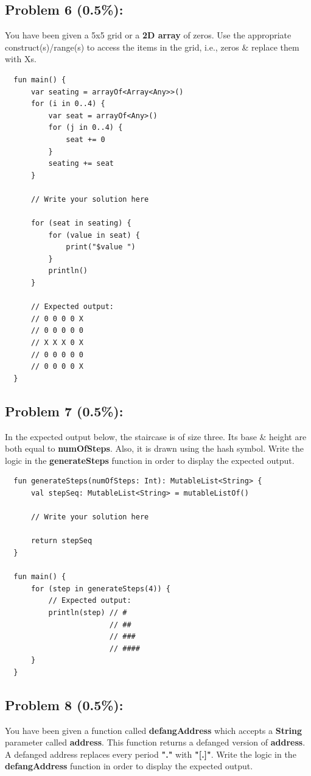 \documentclass{article}
\begin{document}
\subsection*{Problem 6 (0.5\%):}
You have been given a 5x5 grid or a \textbf{2D array} of zeros. Use the appropriate construct(s)/range(s) to access the items in the grid, i.e., zeros \& replace them with Xs.

\begin{verbatim}
  fun main() {
      var seating = arrayOf<Array<Any>>()
      for (i in 0..4) {
          var seat = arrayOf<Any>()
          for (j in 0..4) {
              seat += 0
          }
          seating += seat
      }

      // Write your solution here

      for (seat in seating) {
          for (value in seat) {
              print("$value ")
          }
          println()
      }

      // Expected output:
      // 0 0 0 0 X 
      // 0 0 0 0 0 
      // X X X 0 X 
      // 0 0 0 0 0 
      // 0 0 0 0 X
  }
\end{verbatim}

\subsection*{Problem 7 (0.5\%):}
In the expected output below, the staircase is of size three. Its base \& height are both equal to \textbf{numOfSteps}. Also, it is drawn using the hash symbol. Write the logic in the \textbf{generateSteps} function in order to display the expected output.

\begin{verbatim}
  fun generateSteps(numOfSteps: Int): MutableList<String> {
      val stepSeq: MutableList<String> = mutableListOf()
      
      // Write your solution here
      
      return stepSeq  
  }

  fun main() {
      for (step in generateSteps(4)) {
          // Expected output:
          println(step) // #  
                        // ## 
                        // ###
                        // ####
      }
  }
\end{verbatim}

\subsection*{Problem 8 (0.5\%):}
You have been given a function called \textbf{defangAddress} which accepts a \textbf{String} parameter called \textbf{address}. This function returns a defanged version of \textbf{address}. A defanged address replaces every period \textbf{"."} with \textbf{"[.]"}. Write the logic in the \textbf{defangAddress} function in order to display the expected output.
\end{document}
